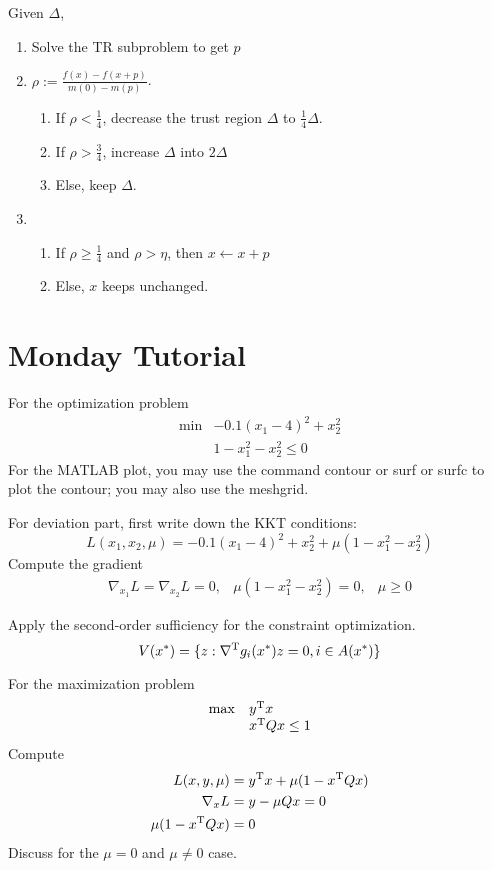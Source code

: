 Given $\Delta$,
\begin{enumerate}
\item
Solve the TR subproblem to get $p$
\item
$\rho:=\frac{f(x) - f(x+p)}{m(0) - m(p)}$. 
\begin{enumerate}
\item
If $\rho<\frac{1}{4}$, decrease the trust region $\Delta$ to $\frac{1}{4}\Delta$.
\item
If $\rho>\frac{3}{4}$, increase $\Delta$ into $2\Delta$
\item
Else, keep $\Delta$.
\end{enumerate}
\item
\begin{enumerate}
\item
If $\rho\ge\frac{1}{4}$ and $\rho>\eta$, then $x\leftarrow x+p$
\item
Else, $x$ keeps unchanged.
\end{enumerate}
\end{enumerate}




\section{Monday Tutorial}
For the optimization problem
\begin{equation}
\begin{array}{ll}
\min&-0.1(x_1-4)^2+x_2^2\\
&1-x_1^2-x_2^2\le0
\end{array}
\end{equation}
For the MATLAB plot, you may use the command contour or surf or surfc to plot the contour; you may also use the meshgrid. 

For deviation part, first write down the KKT conditions:
\[
L(x_1,x_2,\mu)=-0.1(x_1-4)^2+x_2^2+\mu(1-x_1^2-x_2^2)
\]
Compute the gradient 
\[
\begin{array}{lll}
\nabla_{x_1}L=\nabla_{x_2}L=0,
&
\mu(1-x_1^2-x_2^2)=0,
&
\mu\ge0
\end{array}
\]

Apply the second-order sufficiency for the constraint optimization. 
\[
V(x^*)=\{z: \nabla^{\mathrm T} g_i(x^*)z=0, i\in A(x^*)\}
\]

For the maximization problem
\begin{equation}
\begin{array}{ll}
\max&y^{\mathrm T} x\\
&x^{\mathrm T} Qx\le1
\end{array}
\end{equation}
Compute
\begin{align*}
L(x,y,\mu)&=y^{\mathrm T} x+\mu(1-x^{\mathrm T} Qx)\\
\nabla_xL&=y-\mu Qx=0\\
\mu(1-x^{\mathrm T} Qx)&=0
\end{align*}
Discuss for the $\mu=0$ and $\mu\ne0$ case.

